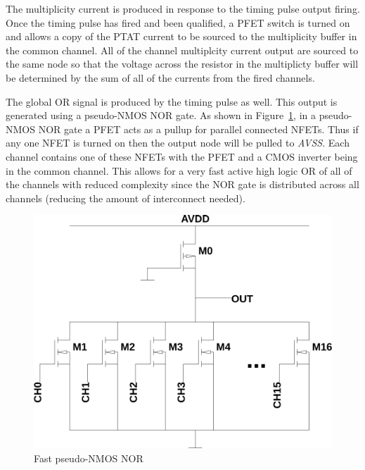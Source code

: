 \documentclass[12pt,oneside,final]{siuethesis}
\theoremstyle{definition}
\begin{document}
\par The multiplicity current is produced in response to the timing pulse output firing. Once the timing pulse has fired and been qualified, a PFET switch is turned on and allows a copy of the PTAT current to be sourced to the multiplicity buffer in the common channel. All of the channel multiplcity current output are sourced to the same node so that the voltage across the resistor in the multiplicty buffer will be determined by the sum of all of the currents from the fired channels. 
\par The global OR signal is produced by the timing pulse as well. This output is generated using a pseudo-NMOS NOR gate. As shown in Figure~\ref{fig:pseudo-nmos}, in a pseudo-NMOS NOR gate a PFET acts as a pullup for parallel connected NFETs. Thus if any one NFET is turned on then the output node will be pulled to \emph{AVSS}. Each channel contains one of these NFETs with the PFET and a CMOS inverter being in the common channel. This allows for a very fast active high logic OR of all of the channels with reduced complexity since the NOR gate is distributed across all channels (reducing the amount of interconnect needed).

\begin{figure}[htbp!]
 \centering
 \includegraphics[scale=.35,keepaspectratio=true]{../LTspice_Drawings/pseudo-nmos/pseudo-nmos.png}
 \caption{Fast pseudo-NMOS NOR}
 \label{fig:pseudo-nmos}
\end{figure}

\end{document}
